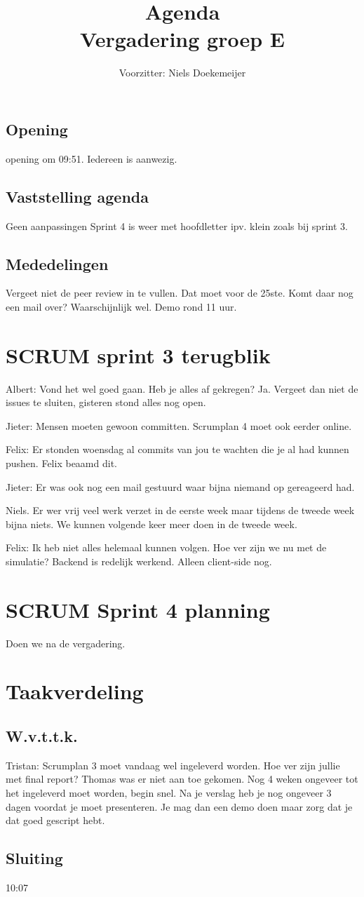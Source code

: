 \documentclass[a4paper]{article}
\title{Agenda \\ Vergadering groep E}
\author{Voorzitter: Niels Doekemeijer}
\begin{document}
\maketitle
\subsection*{Opening}
opening om 09:51. Iedereen is aanwezig.
\subsection*{Vaststelling agenda}
Geen aanpassingen
Sprint 4 is weer met hoofdletter ipv. klein zoals bij sprint 3.
\subsection*{Mededelingen}
Vergeet niet de peer review in te vullen. Dat moet voor de 25ste.
Komt daar nog een mail over? Waarschijnlijk wel.
Demo rond 11 uur.
\section{SCRUM sprint 3 terugblik}
Albert: Vond het wel goed gaan. Heb je alles af gekregen? Ja. Vergeet dan niet de issues te sluiten, gisteren stond alles nog open.

Jieter: Mensen moeten gewoon committen. Scrumplan 4 moet ook eerder online.

Felix: Er stonden woensdag al commits van jou te wachten die je al had kunnen pushen. Felix beaamd dit.

Jieter: Er was ook nog een mail gestuurd waar bijna niemand op gereageerd had.

Niels. Er wer vrij veel werk verzet in de eerste week maar tijdens de tweede week bijna niets. We kunnen volgende keer meer doen in de tweede week.

Felix: Ik heb niet alles helemaal kunnen volgen. Hoe ver zijn we nu met de simulatie? Backend is redelijk werkend. Alleen client-side nog.
\section{SCRUM Sprint 4 planning}
Doen we na de vergadering.
\section{Taakverdeling}
\subsection*{W.v.t.t.k.}
Tristan: Scrumplan 3 moet vandaag wel ingeleverd worden.
Hoe ver zijn jullie met final report? Thomas was er niet aan toe gekomen. Nog 4 weken ongeveer tot het ingeleverd moet worden, begin snel.
Na je verslag heb je nog ongeveer 3 dagen voordat je moet presenteren. Je mag dan een demo doen maar zorg dat je dat goed gescript hebt.
\subsection*{Sluiting}
10:07
\end{document}
